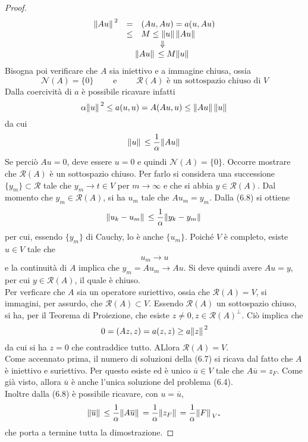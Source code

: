 \documentclass[a4paper,12pt, draft]{article}
\theoremstyle{break}
\numberwithin{equation}{section}
\begin{document}
\begin{proof}
\[\begin{array}{c}
\begin{array}{lcl}
  \norm*{Au}^2 & = & (Au, Au) = a(u, Au) \\
  & \leq & M \leq \norm*{u}\norm*{Au} \\
\end{array} \\
\begin{array}{ccc}
  & &\Downarrow \\
\end{array} \\
\begin{array}{lcl}
  &  &\norm*{Au} \leq M \norm*{u} 
\end{array}  
\end{array}
\]
Bisogna poi verificare che \(A\) sia iniettivo e a immagine chiusa, ossia 
\[
\mathcal{N}(A) = \{0\} \qquad \mbox{ e } \qquad \mathcal{R}(A) \mbox{ è un sottospazio chiuso di }V  
\]
Dalla coercività di \(a\) è possibile ricavare infatti
\[
  \alpha\norm*{u}^2 \leq a(u,u) = A(Au, u) \leq \norm*{Au} \norm*{u}
\]
da cui
\begin{equation}
  \norm*{u}\leq\frac{1}{\alpha} \norm*{Au}
\end{equation}
Se perciò \(Au = 0\), deve essere \(u = 0\) e quindi \(\mathcal{N}(A) = \{0\}\).
Occorre mostrare che \(\mathcal{R}(A)\) è un sottospazio chiuso. Per farlo si considera una successione \(\{y_m\} \subset \mathcal{R}\) tale che \(y_m \to t \in V\) per \(m \to \infty\) e che si abbia \(y \in \mathcal{R}(A)\).
Dal momento che \(y_m \in \mathcal{R}(A)\), si ha \(u_m\) tale che \(Au_m = y_m\). Dalla (6.8) si ottiene
\[
 \norm*{u_k - u_m} \leq \frac{1}{\alpha}\norm*{y_k - y_m} 
\]
per cui, essendo \(\{y_m\}\) di Cauchy, lo è anche \(\{u_m\}\). Poiché \(V\) è completo, esiste \(u \in V\) tale che 
\[
  u_m \to u
\]
e la continuità di \(A\) implica che \(y_m = Au_m \to Au\). Si deve quindi avere \(Au = y\), per cui \(y \in \mathcal{R}(A)\), il quale è chiuso. \\
Per verficare che \(A\) sia un operatore suriettivo, ossia che \(\mathcal{R}(A) = V\), si immagini, per assurdo, che \(\mathcal{R}(A) \subset V\). Essendo \(\mathcal{R}(A)\) un sottospazio chiuso, si ha, per il Teorema di Proiezione, che esiste \(z \not = 0, z \in \mathcal{R}(A)^{\perp}\). Ciò implica che 
\[
  0 = (Az, z) = a(z,z) \geq a\norm*{z}^2
\]
da cui si ha \(z = 0\) che contraddice tutto. ALlora \(\mathcal{R}(A) = V\). \\
Come accennato prima, il numero di soluzioni della (6.7) si ricava dal fatto che \(A\) è iniettivo e suriettivo. Per questo esiste ed è unico \(\overline{u} \in V\) tale che \(A\overline{u} = z_F\). Come già visto, allora \(\overline{u}\) è anche l'unica soluzione del problema (6.4). \\
Inoltre dalla (6.8) è possibile ricavare, con \(u = \overline{u}\),
\[
\norm*{\overline{u}} \leq \frac{1}{\alpha} \norm*{A\overline{u}} = \frac{1}{\alpha} \norm*{z_F} = \frac{1}{\alpha}\norm*{F}_{V^*}  
\]
che porta a termine tutta la dimostrazione.
\end{proof}
\end{document}
